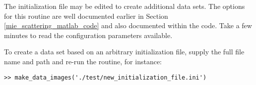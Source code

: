 The initialization file may be edited to create additional data sets.  The options for this routine are well documented earlier in Section \ref{mie_scattering_matlab_code} and also documented within the code.  Take a few minutes to read the configuration parameters available.  

To create a data set based on an arbitrary initialization file, supply the full file name and path and re-run the routine, for instance:

\begin{verbatim}
>> make_data_images('./test/new_initialization_file.ini')
\end{verbatim}
